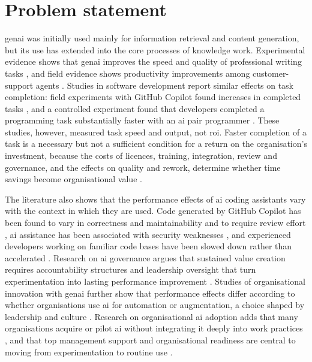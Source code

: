 \section{Problem statement} 
\label{sec:Problem statement} 

\gls{genai} was initially used mainly for information retrieval and content generation, but its use has extended into the core processes of knowledge work. Experimental evidence shows that \gls{genai} improves the speed and quality of professional writing tasks \parencite{Noy2023}, and field evidence shows productivity improvements among customer-support agents \parencite{Brynjolfsson2025}. Studies in software development report similar effects on task completion: field experiments with GitHub Copilot found increases in completed tasks \parencite{Cui2026}, and a controlled experiment found that developers completed a programming task substantially faster with an \gls{ai} pair programmer \parencite{Peng2023}. These studies, however, measured task speed and output, not \gls{roi}. Faster completion of a task is a necessary but not a sufficient condition for a return on the organisation's investment, because the costs of licences, training, integration, review and governance, and the effects on quality and rework, determine whether time savings become organisational value \parencite{Enholm2022, Mikalef2021}.

The literature also shows that the performance effects of \gls{ai} coding assistants vary with the context in which they are used. Code generated by GitHub Copilot has been found to vary in correctness and maintainability and to require review effort \parencite{MoradiDakhel2023}, \gls{ai}  assistance has been associated with security weaknesses \parencite{Pearce2022, Perry2023}, and experienced developers working on familiar code bases have been slowed down rather than accelerated \parencite{Becker2025}. Research on \gls{ai}  governance argues that sustained value creation requires accountability structures and leadership oversight that turn experimentation into lasting performance improvement \parencite{Mantymaki2022, Schneider2023}. Studies of organisational innovation with \gls{genai} further show that performance effects differ according to whether organisations use \gls{ai}  for automation or augmentation, a choice shaped by leadership and culture \parencite{Holmstrom2025}. Research on organisational \gls{ai}  adoption adds that many organisations acquire or pilot \gls{ai} without integrating it deeply into work practices \parencite{Uren2023, Ransbotham2020}, and that top management support and organisational readiness are central to moving from experimentation to routine use \parencite{Johnk2021, Weber2023}.

